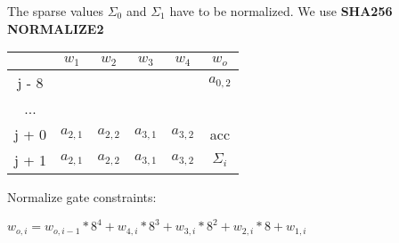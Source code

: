 The sparse values $\Sigma_0$ and $\Sigma_1$ have to be normalized.
We use \textbf{SHA256 NORMALIZE2}
\begin{center}
\begin{tabular}{ |c|c|c|c|c|c } 
  & $w_1$ & $w_2$ & $w_3$ & $w_4$ & $w_o$\\ 
 \hline
j - 8 &  &  &  &  & $a_{0, 2}$\\ 
... &&&&& \\
j + 0 & $a_{2,1}$ & $ a_{2,2}$ & $a_{3,1}$ & $a_{3,2}$ & acc\\ 
j + 1 & $a_{2,1}$ & $ a_{2,2}$ & $a_{3,1}$ & $a_{3,2}$ & $\Sigma_i$ \\ 
 \hline
\end{tabular}
\end{center}

Normalize gate constraints:
\begin{center}
$w_{o,i} = w_{o, i - 1} * 8^4 + w_{4,i}*8^3 + w_{3,i}* 8^2 + w_{2,i} * 8 + w_{1,i}$
\end{center}

